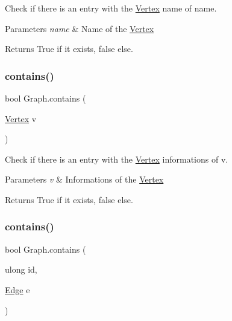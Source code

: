 Check if there is an entry with the \hyperlink{structVertex}{Vertex} name of name. 


\begin{DoxyParams}{Parameters}
{\em name} & Name of the \hyperlink{structVertex}{Vertex}\\
\hline
\end{DoxyParams}
\begin{DoxyReturn}{Returns}
True if it exists, false else.
\end{DoxyReturn}
\mbox{\label{classGraph_a0bc0b974a6c5cc201725227cdd81ede5}} 
\subsubsection{\texorpdfstring{contains()}{contains()}\hspace{0.1cm}{\footnotesize\ttfamily [3/5]}}
{\footnotesize\ttfamily bool Graph.\+contains (\begin{DoxyParamCaption}\item[{\hyperlink{structVertex}{Vertex}}]{v }\end{DoxyParamCaption})\hspace{0.3cm}{\ttfamily [inline]}}



Check if there is an entry with the \hyperlink{structVertex}{Vertex} informations of v. 


\begin{DoxyParams}{Parameters}
{\em v} & Informations of the \hyperlink{structVertex}{Vertex}\\
\hline
\end{DoxyParams}
\begin{DoxyReturn}{Returns}
True if it exists, false else.
\end{DoxyReturn}
\mbox{\label{classGraph_a94644d90ce28798e081bfc54af466efc}} 
\subsubsection{\texorpdfstring{contains()}{contains()}\hspace{0.1cm}{\footnotesize\ttfamily [4/5]}}
{\footnotesize\ttfamily bool Graph.\+contains (\begin{DoxyParamCaption}\item[{ulong}]{id,  }\item[{\hyperlink{classEdge}{Edge}}]{e }\end{DoxyParamCaption})\hspace{0.3cm}{\ttfamily [inline]}}



